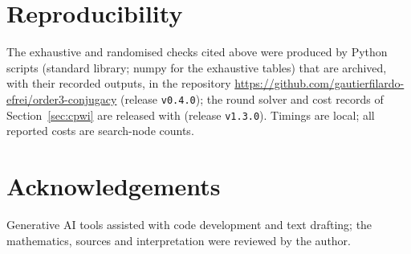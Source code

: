 \documentclass[preprint,12pt]{elsarticle}
\theoremstyle{definition}\newtheorem{defi}[thm]{Definition}\newtheorem{prob}[thm]{Problem}\newtheorem{obs}[thm]{Observation}
\theoremstyle{remark}\newtheorem{rem}[thm]{Remark}
\begin{document}
\section*{Reproducibility} The exhaustive and randomised checks cited above were produced by Python scripts (standard library; numpy for the exhaustive tables) that are archived, with their recorded outputs, in the repository \url{https://github.com/gautierfilardo-efrei/order3-conjugacy} (release \texttt{v0.4.0}); the round solver and cost records of Section~\ref{sec:cpwi} are released with \cite{filardo2026cpwi} (release \texttt{v1.3.0}). Timings are local; all reported costs are search-node counts.

\section*{Acknowledgements} Generative AI tools assisted with code development and text drafting; the mathematics, sources and interpretation were reviewed by the author.



\end{document}
